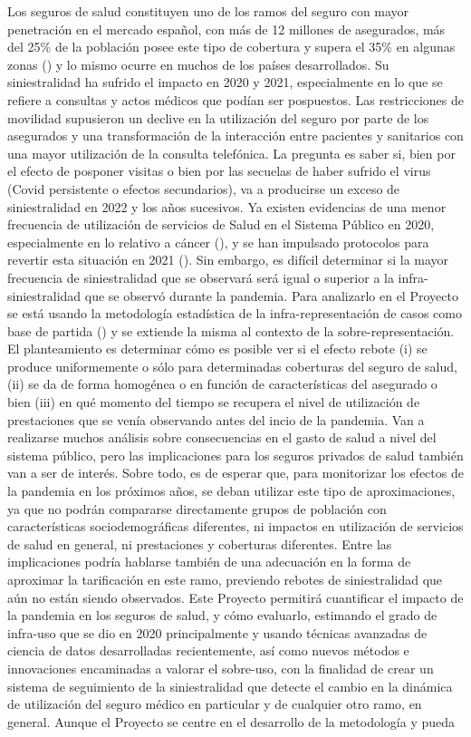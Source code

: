 \documentclass[12pt,twoside]{article} %
\begin{document}
Los seguros de salud constituyen uno de los ramos del seguro con mayor penetración en el mercado español, con más de 12 millones de asegurados, más del 25\% de la población posee este tipo de cobertura y supera el 35\% en algunas zonas (\cite{UNESPA2020}) y lo mismo ocurre en muchos de los países desarrollados. Su siniestralidad ha sufrido el impacto en 2020 y 2021, especialmente en lo que se refiere a consultas y actos médicos que podían ser pospuestos. Las restricciones de movilidad supusieron un declive en la utilización del seguro por parte de los asegurados y una transformación de la interacción entre pacientes y sanitarios con una mayor utilización de la consulta telefónica. La pregunta es saber si, bien por el efecto de posponer visitas o bien por las secuelas de haber sufrido el virus (Covid persistente o efectos secundarios), va a producirse un exceso de siniestralidad en 2022 y los años sucesivos. Ya existen evidencias de una menor frecuencia de utilización de servicios de Salud en el Sistema Público en 2020, especialmente en lo relativo a cáncer (\cite{Cancer2020}), y se han impulsado protocolos para revertir esta situación en 2021 (\cite{MinisteriodeSanidad2021}). Sin embargo, es difícil determinar si la mayor frecuencia de siniestralidad que se observará será igual o superior a la infra-siniestralidad que se observó durante la pandemia. Para analizarlo en el Proyecto se está usando la metodología estadística de la infra-representación de casos como base de partida (\cite{Fernandez-Fontelo2016, FernandezFontelo2019}) y se extiende la misma al contexto de la sobre-representación. El planteamiento es determinar cómo es posible ver si el efecto rebote (i) se produce uniformemente o sólo para determinadas coberturas del seguro de salud, (ii) se da de forma homogénea o en función de características del asegurado o bien (iii) en qué momento del tiempo se recupera el nivel de utilización de prestaciones que se venía observando antes del incio de la pandemia. Van a realizarse muchos análisis sobre consecuencias en el gasto de salud a nivel del sistema público, pero las implicaciones para los seguros privados de salud también van a ser de interés. Sobre todo, es de esperar que, para monitorizar los efectos de la pandemia en los próximos años, se deban utilizar este tipo de aproximaciones, ya que no podrán compararse directamente grupos de población con características sociodemográficas diferentes, ni impactos en utilización de servicios de salud en general, ni prestaciones y coberturas diferentes. Entre las implicaciones podría hablarse también de una adecuación en la forma de aproximar la tarificación en este ramo, previendo rebotes de siniestralidad que aún no están siendo observados. Este Proyecto permitirá cuantificar el impacto de la pandemia en los seguros de salud, y cómo evaluarlo, estimando el grado de infra-uso que se dio en 2020 principalmente y usando técnicas avanzadas de ciencia de datos desarrolladas recientemente, así como nuevos métodos e innovaciones encaminadas a valorar el sobre-uso, con la finalidad de crear un sistema de seguimiento de la siniestralidad que detecte el cambio en la dinámica de utilización del seguro médico en particular y de cualquier otro ramo, en general. Aunque el Proyecto se centre en el desarrollo de la metodología y pueda 
\end{document}
